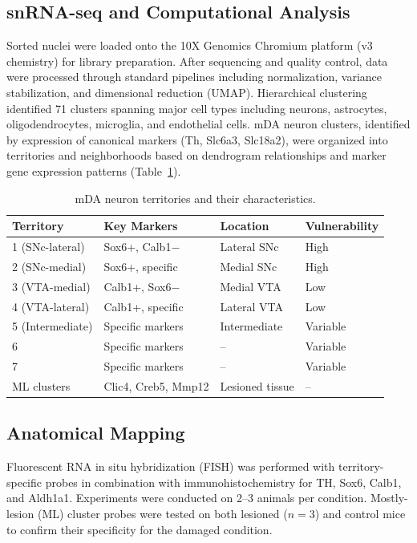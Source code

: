 \documentclass[12pt]{article}
\begin{document}
\subsection{snRNA-seq and Computational Analysis}

Sorted nuclei were loaded onto the 10X Genomics Chromium platform (v3 chemistry) for library preparation. After sequencing and quality control, data were processed through standard pipelines including normalization, variance stabilization, and dimensional reduction (UMAP). Hierarchical clustering identified 71 clusters spanning major cell types including neurons, astrocytes, oligodendrocytes, microglia, and endothelial cells. mDA neuron clusters, identified by expression of canonical markers (Th, Slc6a3, Slc18a2), were organized into territories and neighborhoods based on dendrogram relationships and marker gene expression patterns (Table~\ref{tab:territories}).

\begin{table}[ht]
\centering
\caption{mDA neuron territories and their characteristics.}
\label{tab:territories}
\begin{tabular}{llll}
\toprule
Territory & Key Markers & Location & Vulnerability \\
\midrule
1 (SNc-lateral) & Sox6+, Calb1$-$ & Lateral SNc & High \\
2 (SNc-medial) & Sox6+, specific & Medial SNc & High \\
3 (VTA-medial) & Calb1+, Sox6$-$ & Medial VTA & Low \\
4 (VTA-lateral) & Calb1+, specific & Lateral VTA & Low \\
5 (Intermediate) & Specific markers & Intermediate & Variable \\
6 & Specific markers & -- & Variable \\
7 & Specific markers & -- & Variable \\
ML clusters & Clic4, Creb5, Mmp12 & Lesioned tissue & -- \\
\bottomrule
\end{tabular}
\end{table}

\subsection{Anatomical Mapping}

Fluorescent RNA in situ hybridization (FISH) was performed with territory-specific probes in combination with immunohistochemistry for TH, Sox6, Calb1, and Aldh1a1. Experiments were conducted on 2--3 animals per condition. Mostly-lesion (ML) cluster probes were tested on both lesioned ($n = 3$) and control mice to confirm their specificity for the damaged condition.
\end{document}
